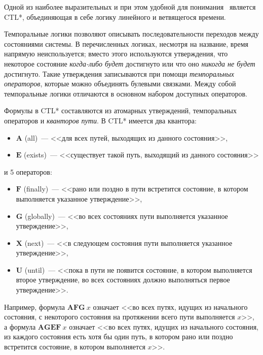 \documentclass[a4paper,notitlepage,14pt]{article}
\begin{document}
Одной из наиболее выразительных и при этом удобной для понимания~\cite{Stirling96modaland}
является CTL*, объединяющая в себе логику линейного и ветвящегося времени.

Темпоральные логики позволяют описывать последовательности переходов между состояниями
системы. В перечисленных логиках, несмотря на название, время напрямую неиспользуется;
вместо этого используются утверждения, что некоторое состояние \emph{когда-либо будет}
достигнуто или что оно \emph{никогда не будет} достигнуто. Такие утверждения записываются
при помощи \emph{темпоральных операторов}, которые можно объединять булевыми
связками. Между собой темпоральные логики отличаются в основном набором доступных
операторов.

Формулы в CTL* составляются из атомарных утверждений, темпоральных операторов и
\emph{кванторов пути}. В CTL* имеется два квантора:

\begin{itemize}
\item $\mathbf{A}$ (all)~--- <<для всех путей, выходящих из данного состояния>>,
\item $\mathbf{E}$ (exists)~--- <<существует такой путь, выходящий из данного состояния>>
\end{itemize}

\noindent и 5 операторов:

\begin{itemize}
\item $\mathbf{F}$ (finally)~--- <<рано или поздно в пути встретится состояние, в котором
  выполняется указанное утверждение>>,
\item $\mathbf{G}$ (globally)~--- <<во всех состояниях пути выполняется указанное
  утверждение>>,
\item $\mathbf{X}$ (next)~--- <<в следующем состояния пути выполняется указанное
  утверждение>>,
\item $\mathbf{U}$ (until)~--- <<пока в пути не появится состояние, в котором выполняется
  второе утверждение, во всех состояниях должно выполняться первое утверждение>>.
\end{itemize}

Например, формула $\mathbf{AFG}~ x$ означает <<во всех путях, идущих из начального
состояния, с некоторого состояния на протяжении всего пути выполняется $x$>>, а формула
$\mathbf{AGEF}~ x$ означает <<во всех путях, идущих из начального состояния, из каждого
состояния есть хотя бы один путь, в котором рано или поздно встретится состояние, в
котором выполняется $x$>>.
\end{document}
